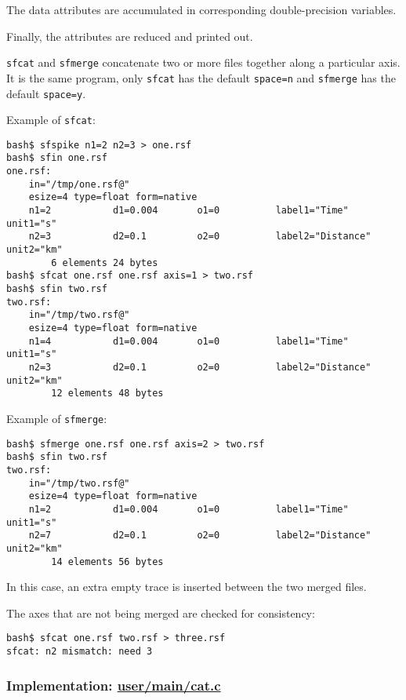 The data attributes are accumulated in corresponding double-precision
variables. 

Finally, the attributes are reduced and printed out.

\noindent\doublebox{\parbox{\textwidth}{

}}

\texttt{sfcat} and \texttt{sfmerge} concatenate two or more files
together along a particular axis. It is the same program, only
\texttt{sfcat} has the default \texttt{space=n} and \texttt{sfmerge}
has the default \texttt{space=y}.

Example of \texttt{sfcat}:
\begin{verbatim}
bash$ sfspike n1=2 n2=3 > one.rsf
bash$ sfin one.rsf
one.rsf:
    in="/tmp/one.rsf@"
    esize=4 type=float form=native
    n1=2           d1=0.004       o1=0          label1="Time" unit1="s"
    n2=3           d2=0.1         o2=0          label2="Distance" unit2="km"
        6 elements 24 bytes
bash$ sfcat one.rsf one.rsf axis=1 > two.rsf
bash$ sfin two.rsf
two.rsf:
    in="/tmp/two.rsf@"
    esize=4 type=float form=native
    n1=4           d1=0.004       o1=0          label1="Time" unit1="s"
    n2=3           d2=0.1         o2=0          label2="Distance" unit2="km"
        12 elements 48 bytes
\end{verbatim}

Example of \texttt{sfmerge}:
\begin{verbatim}
bash$ sfmerge one.rsf one.rsf axis=2 > two.rsf
bash$ sfin two.rsf
two.rsf:
    in="/tmp/two.rsf@"
    esize=4 type=float form=native
    n1=2           d1=0.004       o1=0          label1="Time" unit1="s"
    n2=7           d2=0.1         o2=0          label2="Distance" unit2="km"
        14 elements 56 bytes
\end{verbatim}
In this case, an extra empty trace is inserted between the two merged files.

The axes that are not being merged are checked for consistency:
\begin{verbatim}
bash$ sfcat one.rsf two.rsf > three.rsf
sfcat: n2 mismatch: need 3
\end{verbatim}

\subsubsection{Implementation: \href{http://rsf.svn.sourceforge.net/viewvc/rsf/trunk/user/main/cat.c?view=markup}{user/main/cat.c}}

